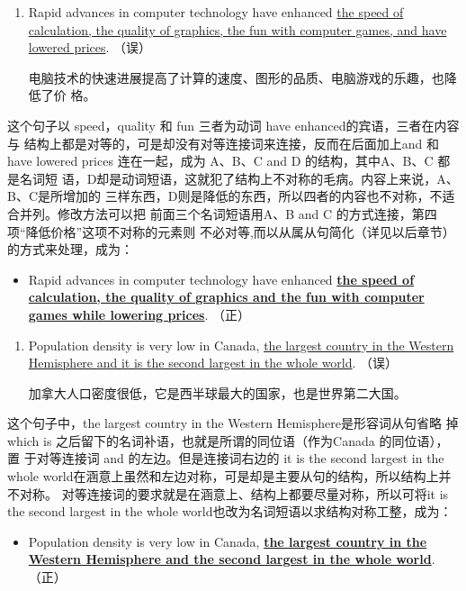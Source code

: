 \begin{enumerate}[resume]
\item Rapid advances in computer technology have enhanced \ul{the speed of
    calculation, the quality of graphics, the fun with computer games, and
    have lowered prices}. （误）

  电脑技术的快速进展提高了计算的速度、图形的品质、电脑游戏的乐趣，也降低了价
  格。
\end{enumerate}
这个句子以 speed，quality 和 fun 三者为动词 have enhanced的宾语，三者在内容与
结构上都是对等的，可是却没有对等连接词来连接，反而在后面加上and 和 have
lowered prices 连在一起，成为 A、B、C and D 的结构，其中A、B、C 都是名词短
语，D却是动词短语，这就犯了结构上不对称的毛病。内容上来说，A、B、C是所增加的
三样东西，D则是降低的东西，所以四者的内容也不对称，不适合并列。修改方法可以把
前面三个名词短语用A、B and C 的方式连接，第四项“降低价格”这项不对称的元素则
不必对等,而以从属从句简化（详见以后章节）的方式来处理，成为：
\begin{mybox}

\begin{itemize}
\item Rapid advances in computer technology have enhanced \ul{\textbf{the speed of
      calculation, the quality of graphics and the fun with computer games
      while lowering prices}}. （正）
\end{itemize}
\end{mybox}

\begin{enumerate}[resume]
\item Population density is very low in Canada, \ul{the largest country in the
  Western Hemisphere and it is the second largest in the whole world}. （误）

  加拿大人口密度很低，它是西半球最大的国家，也是世界第二大国。
\end{enumerate}
这个句子中，the largest country in the Western Hemisphere是形容词从句省略
掉 which is 之后留下的名词补语，也就是所谓的同位语（作为Canada 的同位语），置
于对等连接词 and 的左边。但是连接词右边的 it is the second largest in the
whole world在涵意上虽然和左边对称，可是却是主要从句的结构，所以结构上并不对称。
对等连接词的要求就是在涵意上、结构上都要尽量对称，所以可将it is the second
largest in the whole world也改为名词短语以求结构对称工整，成为：
\begin{mybox}
\begin{itemize}
\item Population density is very low in Canada, \ul{\textbf{the largest country in
      the Western Hemisphere and the second largest in the whole
      world}}. （正）
\end{itemize}
\end{mybox}

